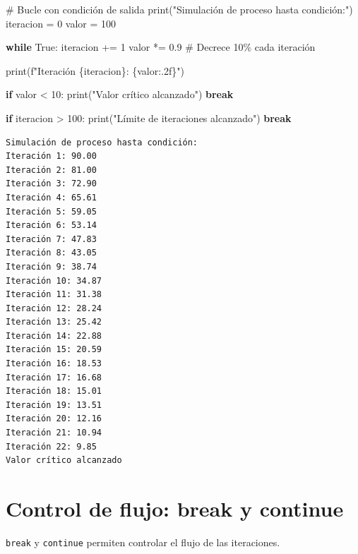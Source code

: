 \documentclass[
  doc,
  floatsintext,
  longtable,
  a4paper,
  nolmodern,
  notxfonts,
  notimes,
  12pt,
  colorlinks=true,linkcolor=blue,citecolor=blue,urlcolor=blue]{apa7}
\newenvironment{Shaded}{\begin{snugshade}}{\end{snugshade}}
\newcommand{\BuiltInTok}[1]{\textcolor[rgb]{0.00,0.23,0.31}{#1}}
\newcommand{\CommentTok}[1]{\textcolor[rgb]{0.37,0.37,0.37}{#1}}
\newcommand{\ControlFlowTok}[1]{\textcolor[rgb]{0.00,0.23,0.31}{\textbf{#1}}}
\newcommand{\DecValTok}[1]{\textcolor[rgb]{0.68,0.00,0.00}{#1}}
\newcommand{\FloatTok}[1]{\textcolor[rgb]{0.68,0.00,0.00}{#1}}
\newcommand{\NormalTok}[1]{\textcolor[rgb]{0.00,0.23,0.31}{#1}}
\newcommand{\OperatorTok}[1]{\textcolor[rgb]{0.37,0.37,0.37}{#1}}
\newcommand{\SpecialCharTok}[1]{\textcolor[rgb]{0.37,0.37,0.37}{#1}}
\newcommand{\SpecialStringTok}[1]{\textcolor[rgb]{0.13,0.47,0.30}{#1}}
\newcommand{\StringTok}[1]{\textcolor[rgb]{0.13,0.47,0.30}{#1}}
\newcommand{\VariableTok}[1]{\textcolor[rgb]{0.07,0.07,0.07}{#1}}
\begin{document}
\begin{Shaded}
\begin{Highlighting}[]
\CommentTok{\# Bucle con condición de salida}
\BuiltInTok{print}\NormalTok{(}\StringTok{"Simulación de proceso hasta condición:"}\NormalTok{)}
\NormalTok{iteracion }\OperatorTok{=} \DecValTok{0}
\NormalTok{valor }\OperatorTok{=} \DecValTok{100}

\ControlFlowTok{while} \VariableTok{True}\NormalTok{:}
\NormalTok{    iteracion }\OperatorTok{+=} \DecValTok{1}
\NormalTok{    valor }\OperatorTok{*=} \FloatTok{0.9}  \CommentTok{\# Decrece 10\% cada iteración}
    
    \BuiltInTok{print}\NormalTok{(}\SpecialStringTok{f"Iteración }\SpecialCharTok{\{}\NormalTok{iteracion}\SpecialCharTok{\}}\SpecialStringTok{: }\SpecialCharTok{\{}\NormalTok{valor}\SpecialCharTok{:.2f\}}\SpecialStringTok{"}\NormalTok{)}
    
    \ControlFlowTok{if}\NormalTok{ valor }\OperatorTok{\textless{}} \DecValTok{10}\NormalTok{:}
        \BuiltInTok{print}\NormalTok{(}\StringTok{"Valor crítico alcanzado"}\NormalTok{)}
        \ControlFlowTok{break}
    
    \ControlFlowTok{if}\NormalTok{ iteracion }\OperatorTok{\textgreater{}} \DecValTok{100}\NormalTok{:}
        \BuiltInTok{print}\NormalTok{(}\StringTok{"Límite de iteraciones alcanzado"}\NormalTok{)}
        \ControlFlowTok{break}
\end{Highlighting}
\end{Shaded}

\begin{verbatim}
Simulación de proceso hasta condición:
Iteración 1: 90.00
Iteración 2: 81.00
Iteración 3: 72.90
Iteración 4: 65.61
Iteración 5: 59.05
Iteración 6: 53.14
Iteración 7: 47.83
Iteración 8: 43.05
Iteración 9: 38.74
Iteración 10: 34.87
Iteración 11: 31.38
Iteración 12: 28.24
Iteración 13: 25.42
Iteración 14: 22.88
Iteración 15: 20.59
Iteración 16: 18.53
Iteración 17: 16.68
Iteración 18: 15.01
Iteración 19: 13.51
Iteración 20: 12.16
Iteración 21: 10.94
Iteración 22: 9.85
Valor crítico alcanzado
\end{verbatim}

\section{Control de flujo: break y
continue}\label{control-de-flujo-break-y-continue}

\texttt{break} y \texttt{continue} permiten controlar el flujo de las
iteraciones.
\end{document}
